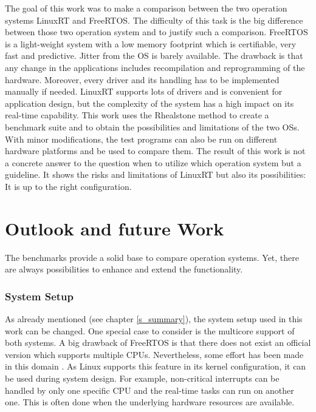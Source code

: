 The goal of this work was to make a comparison between the two operation systems LinuxRT and FreeRTOS. 
The difficulty of this task is the big difference between those two operation system and to justify such a comparison.
FreeRTOS is a light-weight system with a low memory footprint which is certifiable, very fast and predictive. 
Jitter from the \ac{OS} is barely available. 
The drawback is that any change in the applications includes recompilation and reprogramming of the hardware.
Moreover, every driver and its handling has to be implemented manually if needed.
LinuxRT supports lots of drivers and is convenient for application design, but the complexity of the system has a high impact on its real-time capability.
This work uses the Rhealstone method to create a benchmark suite and to obtain the possibilities and limitations of the two \acp{OS}.
With minor modifications, the test programs can also be run on different hardware platforms and be used to compare  them.
The result of this work is not a concrete answer to the question when to utilize which operation system but a guideline.
It shows the risks and limitations of LinuxRT but also its possibilities: It is up to the right configuration. 

\section{Outlook and future Work}
The benchmarks provide a solid base to compare operation systems.
Yet, there are always possibilities to enhance and extend the functionality.

\subsubsection{System Setup}
As already mentioned (see chapter \ref{s_summary}), the system setup used in this work can be changed.
One special case to consider is the multicore support of both systems.
A big drawback of FreeRTOS is that there does not exist an official version which supports multiple \acp{CPU}.
Nevertheless, some effort has been made in this domain \cite{mistry:affmaer}.
As Linux supports this feature in its kernel configuration, it can be used during system design.
For example, non-critical interrupts can be handled by only one specific \ac{CPU} and the real-time tasks can run on another one.
This is often done when the underlying hardware resources are available. 


